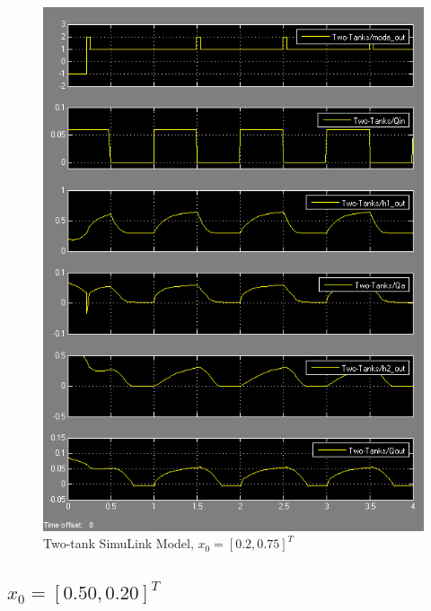 \documentclass{article}
\begin{document}
\begin{figure}[h!]
\centering
\includegraphics[scale=0.7]{hw8_20_75.png}
\caption{Two-tank SimuLink Model, $x_0 = [0.2, 0.75]^T$ }
\label{fig:two-tank-model-20-75}
\end{figure}

\subsection{$x_0 = [0.50, 0.20]^T$}
\end{document}
